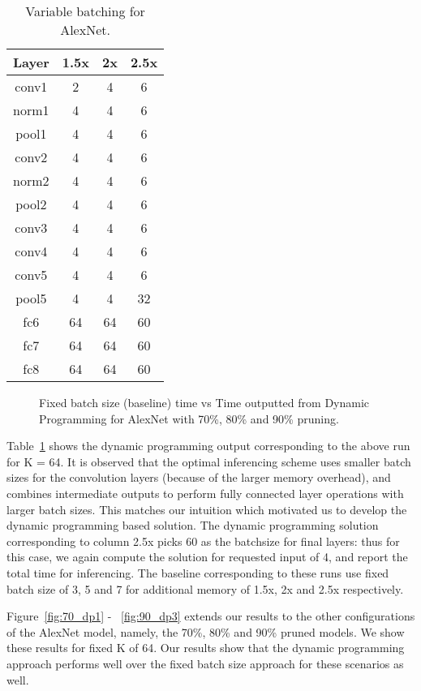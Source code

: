 \begin{table}[h!]
\centering
\begin{tabular}{|c|c|c|c|}
\hline
 Layer & 1.5x & 2x & 2.5x \\ \hline
 conv1 & 2 & 4 & 6    \\ \hline
 norm1 & 4 & 4 & 6    \\ \hline
 pool1 & 4 & 4 & 6    \\ \hline
 conv2 & 4 & 4 & 6    \\ \hline
 norm2 & 4 & 4 & 6    \\ \hline
 pool2 & 4 & 4& 6    \\ \hline
 conv3 & 4 & 4 & 6    \\ \hline
 conv4 & 4 & 4 & 6    \\ \hline
 conv5 & 4 & 4 & 6    \\ \hline
 pool5 & 4 & 4 & 32    \\ \hline
   fc6 & 64 & 64 & 60    \\ \hline
   fc7 & 64& 64 & 60    \\ \hline
   fc8 & 64& 64 & 60    \\ \hline
\end{tabular}
\caption{Variable batching for AlexNet.}
\label{tab:dp_path}
\end{table}


\begin{figure*}[!ht]
  \centering
  \hspace{3mm}
  \hspace{3mm}
  \caption{Fixed batch size (baseline) time vs Time outputted from Dynamic Programming for AlexNet with 70\%, 80\% and 90\% pruning.}
\end{figure*}

Table~\ref{tab:dp_path} shows the dynamic programming output corresponding to the above run for K = 64.
 It is observed that the optimal inferencing scheme uses smaller batch sizes for the convolution layers (because of the larger memory overhead),
 and combines intermediate outputs to perform fully connected layer operations with larger batch sizes. This matches our intuition which motivated us to 
 develop the dynamic programming based solution. The dynamic programming solution  corresponding to column 2.5x picks 60 as the batchsize for final layers: thus for this case, we again compute the solution for requested input of 4, and report the total time for inferencing.  The baseline corresponding to these runs use fixed batch size of 3, 5 and 7 for  additional memory
 of  1.5x, 2x and 2.5x respectively.
 
 Figure~\ref{fig:70_dp1} - ~\ref{fig:90_dp3} extends our   results to the other configurations of the AlexNet model, namely, the
70\%, 80\% and 90\% pruned models. We show these results for fixed K of 64.  Our results show that the dynamic programming approach
performs well  over the fixed batch size approach for these scenarios as well.

